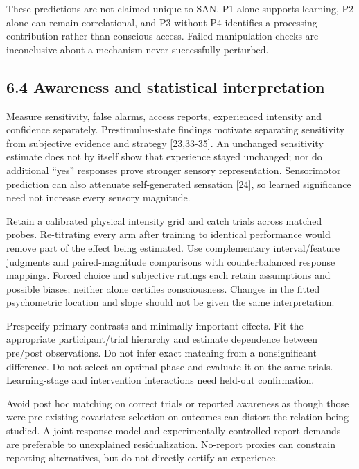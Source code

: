 \documentclass[
  american,
  11pt,
  letterpaper,
]{article}
\begin{document}
These predictions are not claimed unique to SAN. P1 alone supports learning, P2 alone can remain correlational, and P3 without P4 identifies a processing contribution rather than conscious access. Failed manipulation checks are inconclusive about a mechanism never successfully perturbed.

\subsection{6.4 Awareness and statistical interpretation}\label{awareness-and-statistical-interpretation}

Measure sensitivity, false alarms, access reports, experienced intensity and confidence separately. Prestimulus-state findings motivate separating sensitivity from subjective evidence and strategy {[}23,33-35{]}. An unchanged sensitivity estimate does not by itself show that experience stayed unchanged; nor do additional ``yes'' responses prove stronger sensory representation. Sensorimotor prediction can also attenuate self-generated sensation {[}24{]}, so learned significance need not increase every sensory magnitude.

Retain a calibrated physical intensity grid and catch trials across matched probes. Re-titrating every arm after training to identical performance would remove part of the effect being estimated. Use complementary interval/feature judgments and paired-magnitude comparisons with counterbalanced response mappings. Forced choice and subjective ratings each retain assumptions and possible biases; neither alone certifies consciousness. Changes in the fitted psychometric location and slope should not be given the same interpretation.

Prespecify primary contrasts and minimally important effects. Fit the appropriate participant/trial hierarchy and estimate dependence between pre/post observations. Do not infer exact matching from a nonsignificant difference. Do not select an optimal phase and evaluate it on the same trials. Learning-stage and intervention interactions need held-out confirmation.

Avoid post hoc matching on correct trials or reported awareness as though those were pre-existing covariates: selection on outcomes can distort the relation being studied. A joint response model and experimentally controlled report demands are preferable to unexplained residualization. No-report proxies can constrain reporting alternatives, but do not directly certify an experience.
\end{document}
